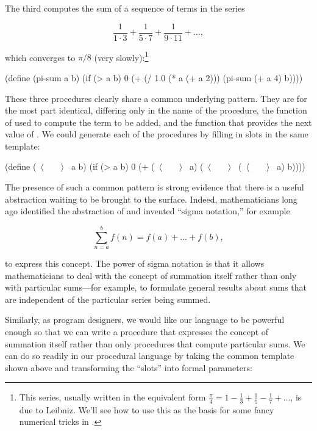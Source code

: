 \noindent
The third computes the sum of a sequence of terms in the series

$$ \frac{1}{1\cdot 3} +  \frac{1}{5\cdot 7} + \frac{1}{9\cdot 11} + \dots, $$

\noindent
which converges to \( \pi / 8 \) (very slowly):\footnote{This series, usually
written in the equivalent form
\( \frac{\pi}{4} = 1 - \frac{1}{3} + \frac{1}{5} - \frac{1}{7} + \dots \),
is due to Leibniz.  We'll see how to use this as the basis for some
fancy numerical tricks in .}

\begin{codeBlock}
(define (pi-sum a b)
  (if (> a b)
      0
      (+ (/ 1.0 (* a (+ a 2)))
         (pi-sum (+ a 4) b))))
\end{codeBlock}

\noindent
These three procedures clearly share a common underlying pattern.  They are for
the most part identical, differing only in the name of the procedure, the
function of  used to compute the term to be added, and the function
that provides the next value of .  We could generate each of the
procedures by filling in slots in the same template:

\begin{codeBlock}
(define (~\(\langle \)~~~~\(\rangle \)~ a b)
  (if (> a b)
      0
      (+ (~\(\langle \)~~~~\(\rangle \)~ a)
         (~\(\langle \)~~~~\(\rangle \)~ (~\(\langle \)~~~~\(\rangle \)~ a) b))))
\end{codeBlock}

\noindent
The presence of such a common pattern is strong evidence that there is a useful
abstraction waiting to be brought to the surface.  Indeed, mathematicians long
ago identified the abstraction of  and invented
``sigma notation,'' for example

$$ \sum\limits_{n=a}^b f(n) = f(a) + \dots + f(b), $$

\noindent
to express this concept.  The power of sigma notation is that it allows
mathematicians to deal with the concept of summation itself rather than only
with particular sums---for example, to formulate general results about sums
that are independent of the particular series being summed.

Similarly, as program designers, we would like our language to be powerful
enough so that we can write a procedure that expresses the concept of summation
itself rather than only procedures that compute particular sums.  We can do so
readily in our procedural language by taking the common template shown above
and transforming the ``slots'' into formal parameters:

